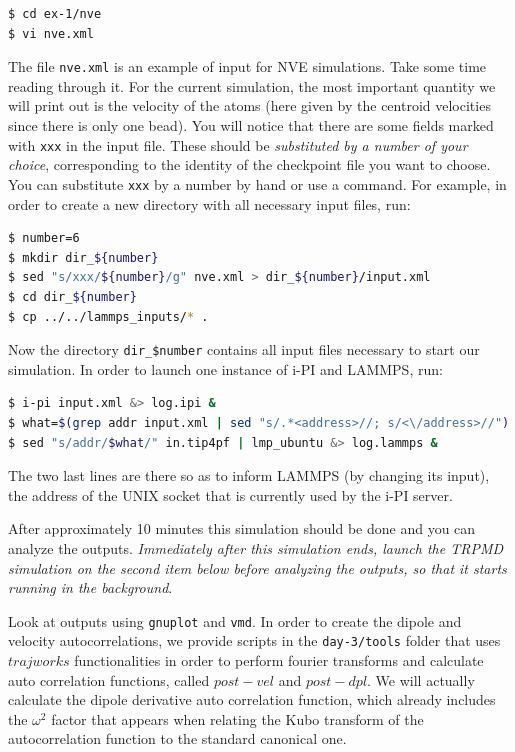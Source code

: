 \documentclass{article}
\begin{document}
\begin{Exercise}[label={realtime},title={Velocity and dipole real time correlation functions}]
\begin{itemize}
\begin{lstlisting}[language=Bash,emph={\$}]
$ cd ex-1/nve
$ vi nve.xml
\end{lstlisting}

   The file \texttt{nve.xml} is an example of input for NVE simulations. Take some time reading through it. For the current simulation, the most important quantity we will print out is the velocity of the atoms (here given by the centroid velocities since there is only one bead). You will notice that there are some fields marked with \texttt{xxx} in the input file. These should be {\it substituted by a number of your choice}, corresponding to the identity of the checkpoint file you want to choose. You can substitute \texttt{xxx} by a number  by hand or use a command. For example, in order to create a new directory with all necessary input files, run:

\begin{lstlisting}[language=Bash,emph={\$}]
$ number=6
$ mkdir dir_${number} 
$ sed "s/xxx/${number}/g" nve.xml > dir_${number}/input.xml
$ cd dir_${number}
$ cp ../../lammps_inputs/* .

\end{lstlisting}

Now the directory \texttt{dir\_\$number} contains all input files necessary to start our simulation. In order to launch one instance of i-PI and LAMMPS, run:

\begin{lstlisting}[language=Bash,emph={\$}]
$ i-pi input.xml &> log.ipi &
$ what=$(grep addr input.xml | sed "s/.*<address>//; s/<\/address>//")
$ sed "s/addr/$what/" in.tip4pf | lmp_ubuntu &> log.lammps &

\end{lstlisting}

The two last lines are there so as to inform LAMMPS (by changing its input), the address of the UNIX socket that is currently used by the i-PI server.

After approximately 10 minutes this simulation should be done and you can analyze the outputs. {\it Immediately after this simulation ends, launch the TRPMD simulation on the second item below before analyzing the outputs, so that it starts running in the background}.

Look at outputs using \texttt{gnuplot} and \texttt{vmd}. In order to create the dipole and velocity autocorrelations, we provide scripts in the \texttt{day-3/tools} folder that uses \lstinbash$trajworks$ functionalities in order to perform fourier transforms and calculate auto correlation functions, called \lstinbash$post-vel$ and \lstinbash$post-dpl$. We will actually calculate the dipole derivative auto correlation function, which already includes the $\omega^2$ factor that appears when relating the Kubo transform of the autocorrelation function to the standard canonical one.


\end{itemize}
\end{Exercise}
\end{document}
